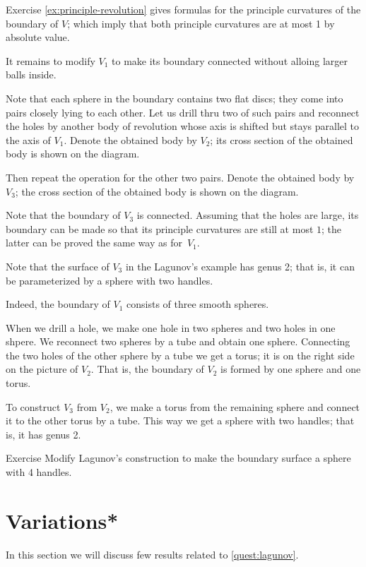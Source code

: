 Exercise \ref{ex:principle-revolution} gives formulas for the principle curvatures of the boundary of $V$;
which imply that both principle curvatures are at most 1 by absolute value.  

It remains to modify $V_1$ to make its boundary connected without  alloing larger balls inside.

Note that each sphere in the boundary contains two flat discs;
they come into pairs closely lying to each other. 
Let us drill thru two of such pairs and reconnect the holes by another body of revolution whose 
axis is shifted but stays parallel to the axis of $V_1$.
Denote the obtained body by $V_2$; its cross section of the obtained body is shown on the diagram. 

Then repeat the operation for the other two pairs.
Denote the obtained body by $V_3$; the cross section of the obtained body is shown on the diagram.

Note that the boundary of $V_3$ is connected.
Assuming that the holes are large, its boundary can be made so that its principle curvatures are still at most $1$; the latter can be proved the same way as for~$V_1$.
\qeds


Note that the surface of $V_3$ in the Lagunov's example has genus 2;
that is, it can be parameterized by a sphere with two handles.

Indeed, the boundary of $V_1$ consists of three smooth spheres.

When we drill a hole, we make one hole in two spheres and two holes in one shpere.
We reconnect two spheres by a tube and obtain one sphere.
Connecting the two holes of the other sphere by a tube we get a torus;
it is on the right side on the picture of $V_2$.
That is, the boundary of $V_2$ is formed by one sphere and one torus.

To construct $V_3$ from $V_2$, we make a torus from the remaining sphere and connect it to the other torus by a tube.
This way we get a sphere with two handles; that is, it has genus 2.

\begin{thm}{Exercise}\label{ex:lagunov-genus4}
Modify Lagunov's construction to make the boundary surface a sphere with 4 handles.
\end{thm}

\section*{Variations*}

In this section we will discuss few results related to \ref{quest:lagunov}.

